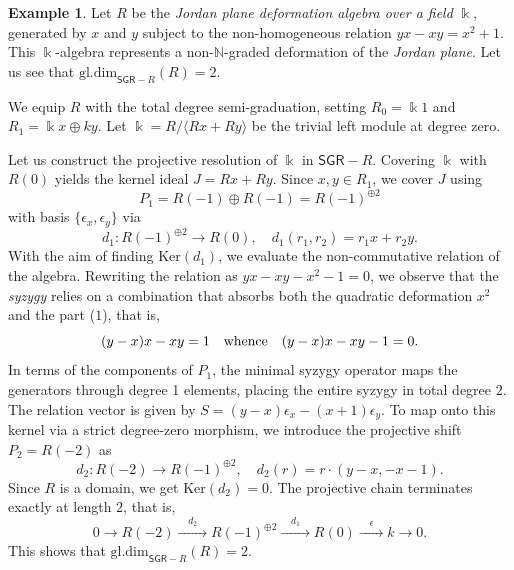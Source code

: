 \documentclass[reqno]{amsart}
\theoremstyle{definition}
\newtheorem{example}[theorem]{Example}
\theoremstyle{remark}
\numberwithin{equation}{section}
\begin{document}
\begin{example}
Let $R$ be the {\em Jordan plane deformation algebra over a field} $\Bbbk$, generated by $x$ and $y$ subject to the non-homogeneous relation $yx - xy = x^2 + 1$. This $\Bbbk$-algebra represents a non-$\mathbb{N}$-graded deformation of the {\em Jordan plane}. Let us see that $\mathrm{gl.dim}_{\mathsf{SGR}-R}(R) = 2$.

We equip $R$ with the total degree semi-graduation, setting $R_0 = \Bbbk 1$ and $R_1 = \Bbbk x \oplus k y$. Let $\Bbbk = R/\langle Rx + Ry\rangle$ be the trivial left module at degree zero.

Let us construct the projective resolution of $\Bbbk$ in $\mathsf{SGR}-R$. Covering $\Bbbk$ with $R(0)$ yields the kernel ideal $J = Rx + Ry$. Since $x, y \in R_1$, we cover $J$ using 
$$
P_1 = R(-1) \oplus R(-1) = R(-1)^{\oplus 2}
$$ 
with basis $\{\epsilon_x, \epsilon_y\}$ via
    \[
    d_1: R(-1)^{\oplus 2} \longrightarrow R(0), \quad d_1(r_1, r_2) = r_1 x + r_2 y.
    \]
With the aim of finding $\mathrm{Ker}(d_1)$, we evaluate the non-commutative relation of the algebra. Rewriting the relation as $yx - xy - x^2 - 1 = 0$, we observe that the {\em syzygy} relies on a combination that absorbs both the quadratic deformation $x^2$ and the part ($1$), that is, 
    \[
    (y - x) x - x y = 1 \quad {\rm whence} \quad (y - x) x - x y - 1 = 0.
    \]
    In terms of the components of $P_1$, the minimal syzygy operator maps the generators through degree 1 elements, placing the entire syzygy in total degree $2$. The relation vector is given by $S = (y - x)\epsilon_x - (x + 1)\epsilon_y$. To map onto this kernel via a strict degree-zero morphism, we introduce the projective shift $P_2 = R(-2)$ as
    \[
    d_2: R(-2) \longrightarrow R(-1)^{\oplus 2}, \quad d_2(r) = r \cdot (y - x, -x - 1).
    \]
    Since $R$ is a domain, we get $\mathrm{Ker}(d_2) = 0$. The projective chain terminates exactly at length $2$, that is, 
    \[
    0 \longrightarrow R(-2) \xrightarrow{\quad d_2 \quad} R(-1)^{\oplus 2} \xrightarrow{\quad d_1 \quad} R(0) \xrightarrow{\quad \epsilon \quad} k \longrightarrow 0.
    \]
    This shows that $\mathrm{gl.dim}_{\mathsf{SGR}-R}(R) = 2$.



\end{example}
\end{document}
